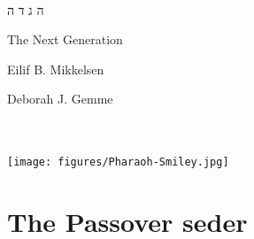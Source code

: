 \documentclass[letter,11pt,openany]{memoir}
\newenvironment{HgHebrew}{\begin{hebrew}\strut\\\noindent\LARGE}{\end{hebrew}}
\begin{document}
\pagestyle{empty}
\strut
\vfill

\begin{center}

\begin{HgHebrew}
\fontsize{120pt}{120pt}
\selectfont
\hspace{-10pt}
ה
\hfill 
ג 
\hfill
ד 
\hfill
ה
\end{HgHebrew}
\vspace{5em}

\fontsize{37pt}{37pt}
\selectfont
The Next Generation

\fontsize{20pt}{28pt}
\selectfont
Eilif B. Mikkelsen

Deborah J. Gemme

\\[.2em]

\\[.5em]
\texttt{[image: figures/Pharaoh-Smiley.jpg]}
\end{center}
\vspace{10em}
\vfill

%
%
%

\chapter*{The Passover seder}

\vfill
\end{document}

